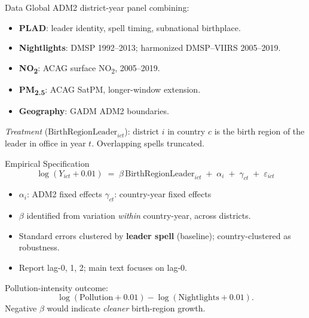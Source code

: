 \documentclass[10pt,aspectratio=169]{beamer}
\begin{document}
\begin{frame}{Data}
Global ADM2 district-year panel combining:
\begin{itemize}
  \item \textbf{PLAD}: leader identity, spell timing, subnational birthplace.
  \item \textbf{Nightlights}: DMSP 1992--2013; harmonized DMSP--VIIRS 2005--2019.
  \item \textbf{NO\textsubscript{2}}: ACAG surface NO\textsubscript{2}, 2005--2019.
  \item \textbf{PM\textsubscript{2.5}}: ACAG SatPM, longer-window extension.
  \item \textbf{Geography}: GADM ADM2 boundaries.
\end{itemize}
\vspace{0.4em}
\textit{Treatment} ($\text{BirthRegionLeader}_{ict}$): district $i$ in country $c$ is the birth region of the leader in office in year $t$. Overlapping spells truncated.
\end{frame}

\begin{frame}{Empirical Specification}
\[
\log(Y_{ict} + 0.01) \;=\; \beta\,\text{BirthRegionLeader}_{ict} \;+\; \alpha_i \;+\; \gamma_{ct} \;+\; \varepsilon_{ict}
\]

\begin{itemize}
  \item $\alpha_i$: ADM2 fixed effects \quad $\gamma_{ct}$: country-year fixed effects
  \item $\beta$ identified from variation \textit{within} country-year, across districts.
  \item Standard errors clustered by \textbf{leader spell} (baseline); country-clustered as robustness.
  \item Report lag-0, 1, 2; main text focuses on lag-0.
\end{itemize}

\vspace{0.3em}
Pollution-intensity outcome:
\[
\log(\text{Pollution}+0.01) - \log(\text{Nightlights}+0.01).
\]
Negative $\beta$ would indicate \textit{cleaner} birth-region growth.
\end{frame}
\end{document}
